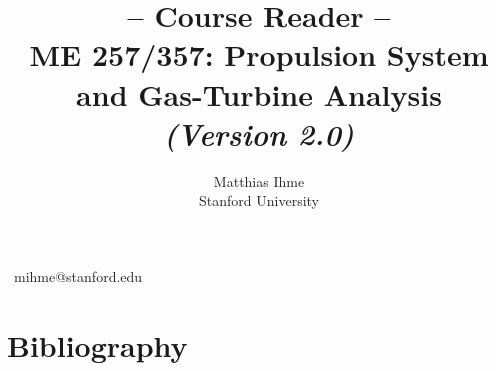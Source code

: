\documentclass[11pt]{article}
\title{-- Course Reader --\\
ME 257/357: Propulsion System and Gas-Turbine Analysis\\
{\small \it(Version 2.0)}}
\author{Matthias Ihme\\
Stanford University}
\begin{document}


\maketitle
\vfill
\begin{center}
\textcopyright~mihme@stanford.edu
\end{center}
\thispagestyle{empty}

\newpage
\setcounter{page}{1}
\tableofcontents

\newpage
\setcounter{page}{1}

\clearpage
\clearpage
\clearpage
\clearpage
\clearpage
\clearpage
\clearpage

\section{Bibliography}


\end{document}
